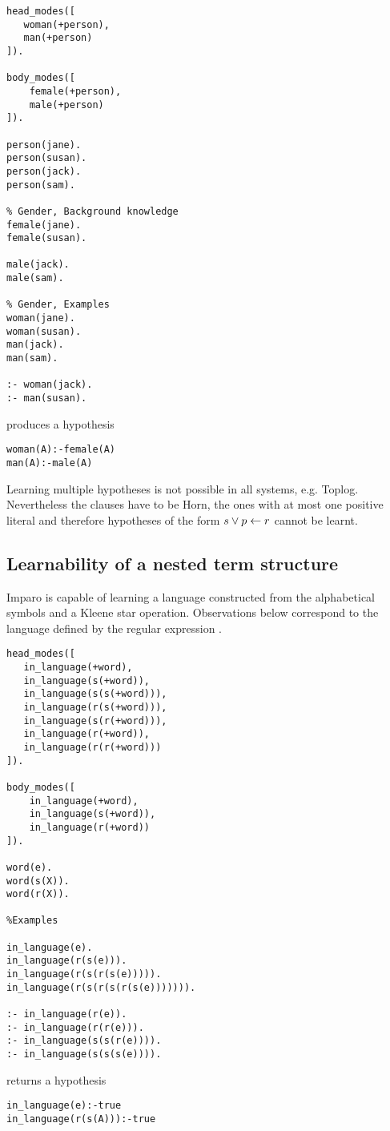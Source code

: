 \begin{lstlisting}
head_modes([
   woman(+person),
   man(+person)
]).

body_modes([
    female(+person),
    male(+person)
]).

person(jane).
person(susan).
person(jack).
person(sam).

% Gender, Background knowledge
female(jane).
female(susan).

male(jack).
male(sam).

% Gender, Examples
woman(jane).
woman(susan).
man(jack).
man(sam).

:- woman(jack).
:- man(susan).
\end{lstlisting}
produces a hypothesis
\begin{lstlisting}
woman(A):-female(A)
man(A):-male(A)
\end{lstlisting}

Learning multiple hypotheses is not possible in all systems, e.g. Toplog. Nevertheless the clauses have to be Horn, the ones with at most one positive literal and therefore hypotheses of the form $s \vee p \leftarrow r$ cannot be learnt.

\subsection{Learnability of a nested term structure}
Imparo is capable of learning a language constructed from the alphabetical symbols and a Kleene star operation. Observations below correspond to the language defined by the regular expression .

\begin{lstlisting}
head_modes([
   in_language(+word),
   in_language(s(+word)),  
   in_language(s(s(+word))),
   in_language(r(s(+word))),
   in_language(s(r(+word))),
   in_language(r(+word)),
   in_language(r(r(+word)))
]).

body_modes([
    in_language(+word),
    in_language(s(+word)),
    in_language(r(+word))
]).

word(e).
word(s(X)).
word(r(X)).

%Examples

in_language(e).
in_language(r(s(e))).
in_language(r(s(r(s(e))))).
in_language(r(s(r(s(r(s(e))))))).

:- in_language(r(e)).
:- in_language(r(r(e))).
:- in_language(s(s(r(e)))).
:- in_language(s(s(s(e)))).
\end{lstlisting}
returns a hypothesis
\begin{lstlisting}
in_language(e):-true
in_language(r(s(A))):-true
\end{lstlisting}

